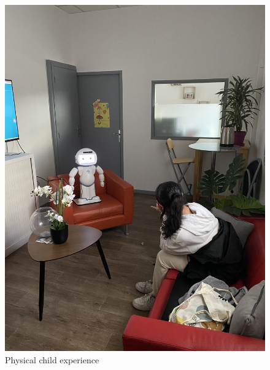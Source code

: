\begin{figure}[htp]
    \centering
    \begin{minipage}[c]{0.5\textwidth}
        \centering
        \includegraphics[width=1.0\textwidth, height=0.3\textheight,keepaspectratio]
        {Figures/ryma.jpg}
        \caption{Physical child experience}
    \end{minipage}%
    \begin{minipage}[c]{0.5\textwidth}
        \centering

\end{minipage}
\end{figure}
